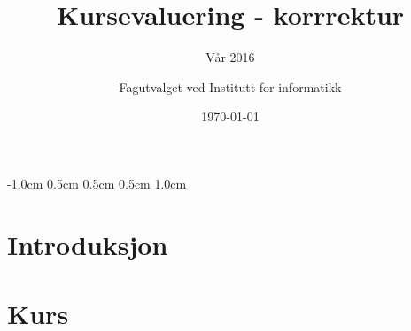 \documentclass[norsk,a4paper,11pt]{report}
\author{Fagutvalget ved Institutt for informatikk}
\title{Kursevaluering - {\color{red}korrrektur}}
\subtitle{Vår 2016}
\date{\today}
\begin{document}
\ififorside{}

\setlength{\topmargin}		{-1.0cm}
\setlength{\headsep}		{0.5cm}
\setlength{\oddsidemargin}	{0.5cm}
\setlength{\evensidemargin}	{0.5cm}
\setlength{\footskip}		{1.0cm}
\renewcommand{\thesection}{}
\renewcommand{\thesubsection}{}
\tableofcontents
\newpage
\chapter{Introduksjon}
\newpage
\chapter{Kurs}
\newpage
\end{document}
